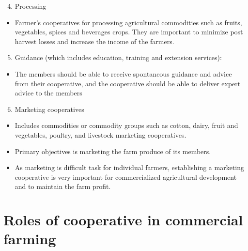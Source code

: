 \documentclass[12pt,ignorenonframetext,aspectratio=169]{beamer}
\providecommand{\tightlist}{%
  \setlength{\itemsep}{0pt}\setlength{\parskip}{0pt}}
\begin{document}
\begin{frame}{}
\protect\hypertarget{section-4}{}
\begin{enumerate}
\setcounter{enumi}{3}
\tightlist
\item
  Processing
\end{enumerate}

\begin{itemize}
\tightlist
\item
  Farmer's cooperatives for processing agricultural commodities such as
  fruits, vegetables, spices and beverages crops. They are important to
  minimize post harvest losses and increase the income of the farmers.
\end{itemize}

\begin{enumerate}
\setcounter{enumi}{4}
\tightlist
\item
  Guidance (which includes education, training and extension services):
\end{enumerate}

\begin{itemize}
\tightlist
\item
  The members should be able to receive spontaneous guidance and advice
  from their cooperative, and the cooperative should be able to deliver
  expert advice to the members
\end{itemize}

\begin{enumerate}
\setcounter{enumi}{5}
\tightlist
\item
  Marketing cooperatives
\end{enumerate}

\begin{itemize}
\tightlist
\item
  Includes commodities or commodity groups such as cotton, dairy, fruit
  and vegetables, poultry, and livestock marketing cooperatives.
\item
  Primary objectives is marketing the farm produce of its members.
\item
  As marketing is difficult task for individual farmers, establishing a
  marketing cooperative is very important for commercialized
  agricultural development and to maintain the farm profit.
\end{itemize}
\end{frame}

\hypertarget{roles-of-cooperative-in-commercial-farming}{%
\section{Roles of cooperative in commercial
farming}\label{roles-of-cooperative-in-commercial-farming}}
\end{document}
